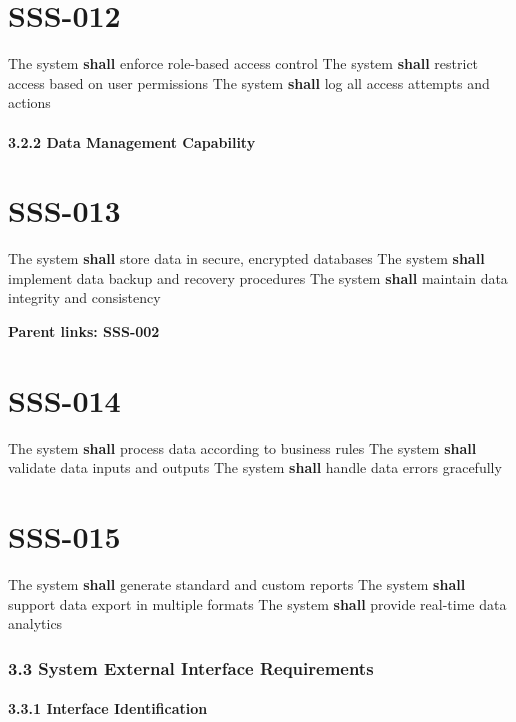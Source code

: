 \section{SSS-012}\label{SSS-012}

The system \textbf{shall} enforce role-based access control
The system \textbf{shall} restrict access based on user permissions
The system \textbf{shall} log all access attempts and actions

\paragraph{3.2.2 Data Management Capability}

\section{SSS-013}\label{SSS-013}

The system \textbf{shall} store data in secure, encrypted databases
The system \textbf{shall} implement data backup and recovery procedures
The system \textbf{shall} maintain data integrity and consistency

\textbf{Parent links: SSS-002}

\section{SSS-014}\label{SSS-014}

The system \textbf{shall} process data according to business rules
The system \textbf{shall} validate data inputs and outputs
The system \textbf{shall} handle data errors gracefully

\section{SSS-015}\label{SSS-015}

The system \textbf{shall} generate standard and custom reports
The system \textbf{shall} support data export in multiple formats
The system \textbf{shall} provide real-time data analytics

\subsubsection{3.3 System External Interface Requirements}

\paragraph{3.3.1 Interface Identification}

